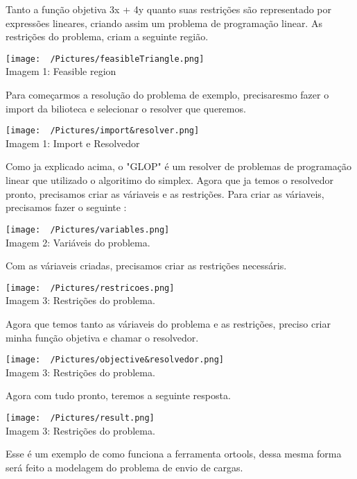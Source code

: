     Tanto a função objetiva 3x + 4y quanto suas restrições são representado por expressões lineares, criando assim um problema de programação linear. 
    As restrições do problema, criam a seguinte região.

    \begin{center}
      \texttt{[image: ~/Pictures/feasibleTriangle.png]}\\
      Imagem 1: Feasible region
    \end{center}

    Para começarmos a resolução do problema de exemplo, precisaresmo fazer o import da bilioteca e selecionar o resolver que queremos. 
    \begin{center}
      \texttt{[image: ~/Pictures/import\&resolver.png]}\\
      Imagem 1: Import e Resolvedor
    \end{center}
    Como ja explicado acima, o "GLOP" é um resolver de problemas de programação linear que utilizado o algoritimo do simplex. 
    Agora que ja temos o resolvedor pronto, precisamos criar as váriaveis e as restrições. Para criar as váriaveis, precisamos fazer o seguinte :
    \begin{center}
      \texttt{[image: ~/Pictures/variables.png]}\\
      Imagem 2: Variáveis do problema.
    \end{center}
    Com as váriaveis criadas, precisamos criar as restrições necessáris.
    \begin{center}
      \texttt{[image: ~/Pictures/restricoes.png]}\\
      Imagem 3: Restrições do problema.
    \end{center}
    Agora que temos tanto as váriaveis do problema e as restrições, preciso criar minha função objetiva e chamar o resolvedor.
    \begin{center}
      \texttt{[image: ~/Pictures/objective\&resolvedor.png]}\\
      Imagem 3: Restrições do problema.
    \end{center}
    Agora com tudo pronto, teremos a seguinte resposta. 
    \begin{center}
      \texttt{[image: ~/Pictures/result.png]}\\
      Imagem 3: Restrições do problema.
    \end{center}

    Esse é um exemplo de como funciona a ferramenta ortools, dessa mesma forma será feito a modelagem do problema de envio de cargas.
    
